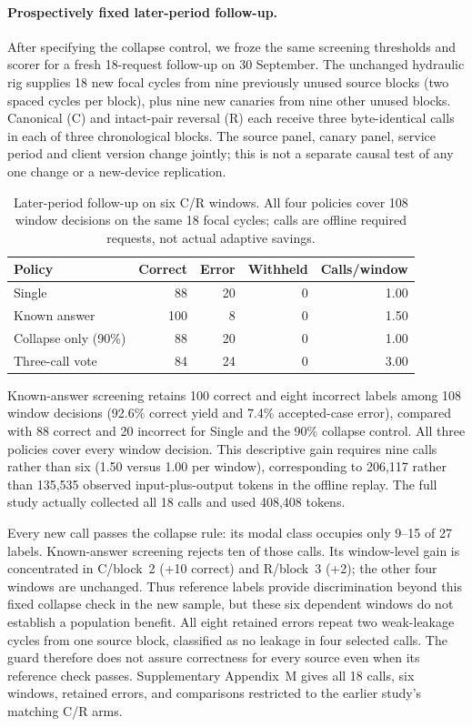\paragraph{Prospectively fixed later-period follow-up.}
After specifying the collapse control, we froze the same screening thresholds and scorer for a fresh 18-request follow-up on 30 September. The unchanged hydraulic rig supplies 18 new focal cycles from nine previously unused source blocks (two spaced cycles per block), plus nine new canaries from nine other unused blocks. Canonical (C) and intact-pair reversal (R) each receive three byte-identical calls in each of three chronological blocks. The source panel, canary panel, service period and client version change jointly; this is not a separate causal test of any one change or a new-device replication.

\begin{table}[htbp]\centering\small
\caption{Later-period follow-up on six C/R windows. All four policies cover 108 window decisions on the same 18 focal cycles; calls are offline required requests, not actual adaptive savings.}
\label{tab:canary_stability_main}
\begin{tabular}{@{}lrrrr@{}}\toprule
Policy & Correct & Error & Withheld & Calls/window \\\midrule
Single & 88 & 20 & 0 & 1.00 \\
Known answer & 100 & 8 & 0 & 1.50 \\
Collapse only (90\%) & 88 & 20 & 0 & 1.00 \\
Three-call vote & 84 & 24 & 0 & 3.00 \\
\bottomrule\end{tabular}\end{table}

Known-answer screening retains 100 correct and eight incorrect labels among 108 window decisions (92.6\% correct yield and 7.4\% accepted-case error), compared with 88 correct and 20 incorrect for Single and the 90\% collapse control. All three policies cover every window decision. This descriptive gain requires nine calls rather than six (1.50 versus 1.00 per window), corresponding to 206,117 rather than 135,535 observed input-plus-output tokens in the offline replay. The full study actually collected all 18 calls and used 408,408 tokens.

Every new call passes the collapse rule: its modal class occupies only 9--15 of 27 labels. Known-answer screening rejects ten of those calls. Its window-level gain is concentrated in C/block~2 (+10 correct) and R/block~3 (+2); the other four windows are unchanged. Thus reference labels provide discrimination beyond this fixed collapse check in the new sample, but these six dependent windows do not establish a population benefit. All eight retained errors repeat two weak-leakage cycles from one source block, classified as no leakage in four selected calls. The guard therefore does not assure correctness for every source even when its reference check passes. Supplementary Appendix~M gives all 18 calls, six windows, retained errors, and comparisons restricted to the earlier study's matching C/R arms.
